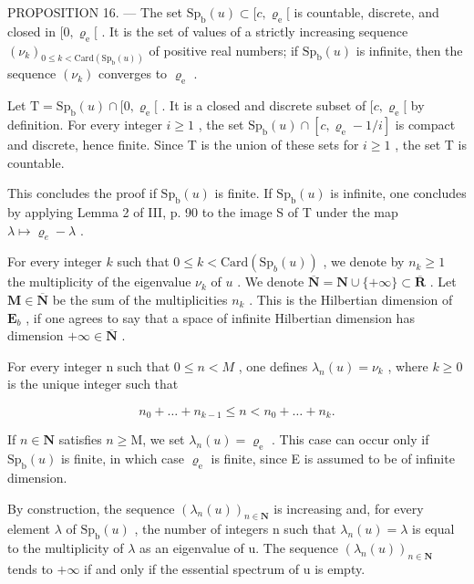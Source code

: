 PROPOSITION 16. --- The set \(\mathrm{Sp}_{\mathrm{b}}(u) \subset [c, \varrho_{\mathrm{e}}[\) is countable, discrete, and closed in \([0, \varrho_{\mathrm{e}}[\) . It is the set of values of a strictly increasing sequence \((\nu_{k})_{0 \leqslant k < \mathrm{Card}(\mathrm{Sp}_{\mathrm{b}}(u))}\) of positive real numbers; if \(\mathrm{Sp}_{\mathrm{b}}(u)\) is infinite, then the sequence \((\nu_{k})\) converges to \(\varrho_{\mathrm{e}}\) .

Let \(\mathrm{T} = \mathrm{Sp}_{\mathrm{b}}(u) \cap [0, \varrho_{\mathrm{e}}[\) . It is a closed and discrete subset of \([c, \varrho_{\mathrm{e}}[\) by definition. For every integer \(i \geqslant 1\) , the set \(\mathrm{Sp}_{\mathrm{b}}(u) \cap [c, \varrho_{\mathrm{e}} - 1/i]\) is compact and discrete, hence finite. Since T is the union of these sets for \(i \geqslant 1\) , the set T is countable.

This concludes the proof if \(\mathrm{Sp}_{\mathrm{b}}(u)\) is finite. If \(\mathrm{Sp}_{\mathrm{b}}(u)\) is infinite, one concludes by applying Lemma 2 of III, p. 90 to the image S of T under the map \(\lambda \mapsto \varrho_{e} - \lambda\) .

For every integer \(k\) such that \(0 \leqslant k < \text{Card}(\text{Sp}_b(u))\) , we denote by \(n_k \geqslant 1\) the multiplicity of the eigenvalue \(\nu_k\) of \(u\) . We denote \(\overline{\mathbf{N}} = \mathbf{N} \cup \{+\infty\} \subset \overline{\mathbf{R}}\) . Let \(\mathbf{M} \in \overline{\mathbf{N}}\) be the sum of the multiplicities \(n_k\) . This is the Hilbertian dimension of \(\mathbf{E}_b\) , if one agrees to say that a space of infinite Hilbertian dimension has dimension \(+\infty \in \overline{\mathbf{N}}\) .

For every integer n such that \(0 \leqslant n < M\) , one defines \(\lambda_{n}(u) = \nu_{k}\) , where \(k \geqslant 0\) is the unique integer such that

\[
n _ {0} + \dots + n _ {k - 1} \leqslant n <   n _ {0} + \dots + n _ {k}.
\]

If \(n \in \mathbf{N}\) satisfies \(n \geqslant \mathrm{M}\), we set \(\lambda_n(u) = \varrho_{\mathrm{e}}\) . This case can occur only if \(\mathrm{Sp}_{\mathrm{b}}(u)\) is finite, in which case \(\varrho_{\mathrm{e}}\) is finite, since E is assumed to be of infinite dimension.

By construction, the sequence \((\lambda_{n}(u))_{n\in\mathbf{N}}\) is increasing and, for every element \(\lambda\) of \(\mathrm{Sp}_{\mathrm{b}}(u)\) , the number of integers n such that \(\lambda_{n}(u)=\lambda\) is equal to the multiplicity of \(\lambda\) as an eigenvalue of u. The sequence \((\lambda_{n}(u))_{n\in\mathbf{N}}\) tends to \(+\infty\) if and only if the essential spectrum of u is empty.

